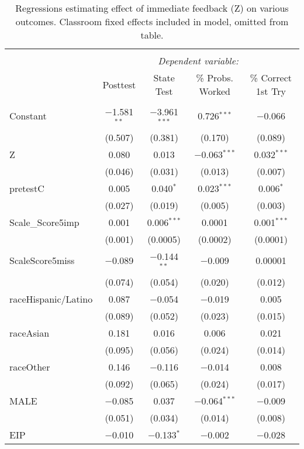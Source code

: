 
\begin{table}[!htbp] \centering 
  \caption{Regressions estimating effect of immediate feedback (Z) on various outcomes. Classroom fixed effects included in model, omitted from table.} 
  \label{} 
\begin{tabular}{@{\extracolsep{5pt}}lcccc} 
\\[-1.8ex]\hline 
\hline \\[-1.8ex] 
 & \multicolumn{4}{c}{\textit{Dependent variable:}} \\ 
\cline{2-5} 
 & Posttest & State Test & \% Probs. Worked & \% Correct 1st Try \\ 
\hline \\[-1.8ex] 
 Constant & $-$1.581$^{**}$ & $-$3.961$^{***}$ & 0.726$^{***}$ & $-$0.066 \\ 
  & (0.507) & (0.381) & (0.170) & (0.089) \\ 
 Z & 0.080 & 0.013 & $-$0.063$^{***}$ & 0.032$^{***}$ \\ 
  & (0.046) & (0.031) & (0.013) & (0.007) \\ 
 pretestC & 0.005 & 0.040$^{*}$ & 0.023$^{***}$ & 0.006$^{*}$ \\ 
  & (0.027) & (0.019) & (0.005) & (0.003) \\ 
 Scale\_Score5imp & 0.001 & 0.006$^{***}$ & 0.0001 & 0.001$^{***}$ \\ 
  & (0.001) & (0.0005) & (0.0002) & (0.0001) \\ 
 ScaleScore5miss & $-$0.089 & $-$0.144$^{**}$ & $-$0.009 & 0.00001 \\ 
  & (0.074) & (0.054) & (0.020) & (0.012) \\ 
 raceHispanic/Latino & 0.087 & $-$0.054 & $-$0.019 & 0.005 \\ 
  & (0.089) & (0.052) & (0.023) & (0.015) \\ 
 raceAsian & 0.181 & 0.016 & 0.006 & 0.021 \\ 
  & (0.095) & (0.056) & (0.024) & (0.014) \\ 
 raceOther & 0.146 & $-$0.116 & $-$0.014 & 0.008 \\ 
  & (0.092) & (0.065) & (0.024) & (0.017) \\ 
 MALE & $-$0.085 & 0.037 & $-$0.064$^{***}$ & $-$0.009 \\ 
  & (0.051) & (0.034) & (0.014) & (0.008) \\ 
 EIP & $-$0.010 & $-$0.133$^{*}$ & $-$0.002 & $-$0.028 \\ 

\end{tabular}
\end{table}
